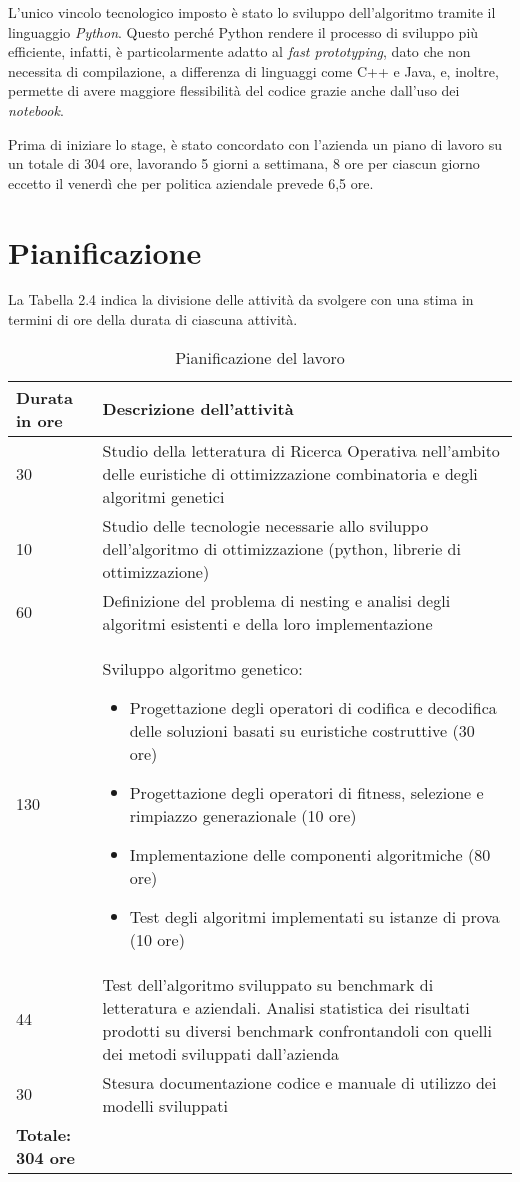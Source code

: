 L'unico vincolo tecnologico imposto è stato lo sviluppo dell'algoritmo tramite il linguaggio \emph{Python}\glsfirstoccur. Questo perché Python rendere il processo di sviluppo più efficiente, infatti, è particolarmente adatto al \emph{fast prototyping}\glsfirstoccur, dato che non necessita di compilazione, a differenza di linguaggi come C++ e Java, e, inoltre, permette di avere maggiore flessibilità del codice grazie anche dall'uso dei \emph{notebook}\glsfirstoccur.

Prima di iniziare lo stage, è stato concordato con l’azienda un piano di lavoro su un totale di 304 ore, lavorando 5 giorni a settimana, 8 ore per ciascun giorno eccetto il venerdì che per politica aziendale prevede 6,5 ore. 

\section{Pianificazione}

La Tabella 2.4 indica la divisione delle attività da svolgere con una stima in termini di ore della durata di ciascuna attività.\\

\begin{table}[H]
\centering
\begin{tabular}{|l|p{10cm}|}
\hline
\textbf{Durata in ore} & \textbf{Descrizione dell'attività} \\ \hline
30 & Studio della letteratura di Ricerca Operativa nell’ambito delle euristiche di ottimizzazione combinatoria e degli algoritmi genetici \\ \hline
10 & Studio delle tecnologie necessarie allo sviluppo dell’algoritmo di ottimizzazione (python, librerie di ottimizzazione) \\ \hline
60 & Definizione del problema di nesting e analisi degli algoritmi esistenti e della loro implementazione \\ \hline
130 & Sviluppo algoritmo genetico:
\begin{itemize}
    \item Progettazione degli operatori di codifica e decodifica delle soluzioni basati su euristiche costruttive (30 ore)
    \item Progettazione degli operatori di fitness, selezione e rimpiazzo generazionale (10 ore)
    \item Implementazione delle componenti algoritmiche (80 ore)
    \item Test degli algoritmi implementati su istanze di prova (10 ore)
\end{itemize} \\ \hline
44 & Test dell'algoritmo sviluppato su benchmark di letteratura e aziendali. Analisi statistica dei risultati prodotti su diversi benchmark confrontandoli con quelli dei metodi sviluppati dall'azienda \\ \hline
30 & Stesura documentazione codice e manuale di utilizzo dei modelli sviluppati \\ \hline
\textbf{Totale: 304 ore} & \\ \hline
\end{tabular}
\caption{Pianificazione del lavoro}
\end{table}

